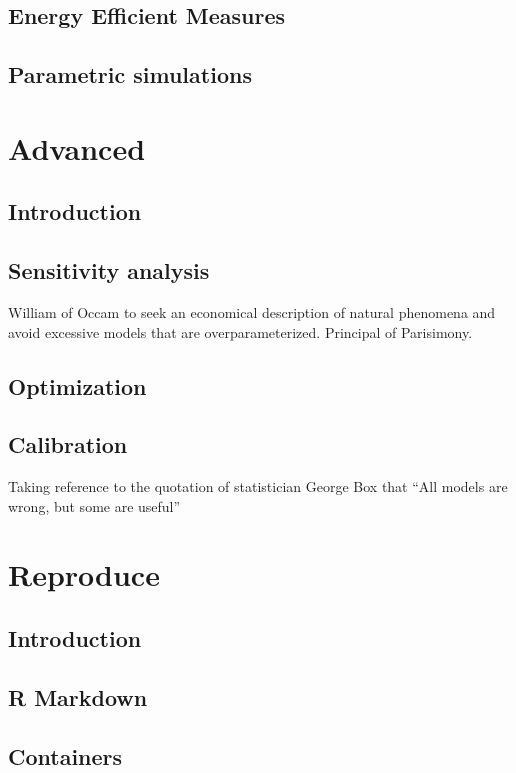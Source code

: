 \documentclass[
]{book}
\begin{document}
\hypertarget{energy-efficient-measures}{%
\chapter{Energy Efficient Measures}\label{energy-efficient-measures}}

\hypertarget{parametric-simulations}{%
\chapter{Parametric simulations}\label{parametric-simulations}}

\hypertarget{part-advanced}{%
\part{Advanced}\label{part-advanced}}

\hypertarget{advanced}{%
\chapter{Introduction}\label{advanced}}

\hypertarget{sensitivity-analysis}{%
\chapter{Sensitivity analysis}\label{sensitivity-analysis}}

William of Occam to seek an economical description of natural phenomena and avoid excessive models that are overparameterized. Principal of Parisimony.

\hypertarget{optimization}{%
\chapter{Optimization}\label{optimization}}

\hypertarget{calibration}{%
\chapter{Calibration}\label{calibration}}

Taking reference to the quotation of statistician George Box that ``All models are wrong, but some are useful''

\hypertarget{part-reproduce}{%
\part{Reproduce}\label{part-reproduce}}

\hypertarget{reproduce}{%
\chapter{Introduction}\label{reproduce}}

\hypertarget{r-markdown}{%
\chapter{R Markdown}\label{r-markdown}}

\hypertarget{containers}{%
\chapter{Containers}\label{containers}}

  
\end{document}

